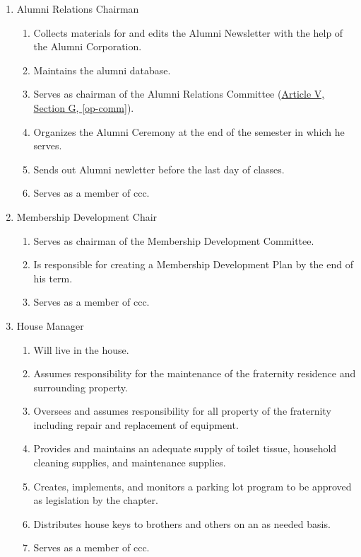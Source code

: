 \begin{enumerate}
				\item Alumni Relations Chairman
					\begin{enumerate}
						\item Collects materials for and edits the Alumni Newsletter with the help of the Alumni Corporation.
						\item Maintains the alumni database.
						\item Serves as chairman of the Alumni Relations Committee (\hyperref[op-comm]{Article V, Section G, \autoref*{op-comm}}).
						\item Organizes the Alumni Ceremony at the end of the semester in which he serves.
                        \item Sends out Alumni newletter before the last day of classes.
						\item Serves as a member of \gls{ccc}.
					\end{enumerate}

				\item Membership Development Chair
					\begin{enumerate}
						\item  Serves as chairman of the Membership Development Committee.
						\item  Is responsible for creating a Membership Development Plan by the end of his term.
						\item Serves as a member of \gls{ccc}.
					\end{enumerate}

				\item House Manager
					\begin{enumerate}
						\item Will live in the house.
						\item Assumes responsibility for the maintenance of the fraternity residence and surrounding property.
						\item Oversees and assumes responsibility for all property of the fraternity including repair and replacement of equipment.
						\item Provides and maintains an adequate supply of toilet tissue, household cleaning supplies, and maintenance supplies.
						\item Creates, implements, and monitors a parking lot program to be approved as legislation by the chapter.
						\item Distributes house keys to brothers and others on an as needed basis.
						\item Serves as a member of \gls{ccc}.
					\end{enumerate}


\end{enumerate}
